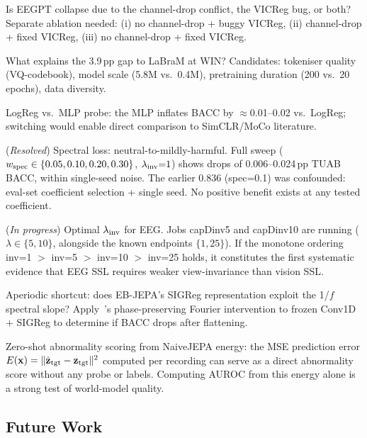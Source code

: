 \documentclass[11pt,a4paper]{article}
\begin{document}
\begin{description}[noitemsep]
  \item[D1] Is EEGPT collapse due to the channel-drop conflict, the VICReg bug, or both?
    Separate ablation needed: (i) no channel-drop + buggy VICReg, (ii) channel-drop +
    fixed VICReg, (iii) no channel-drop + fixed VICReg.
  \item[D2] What explains the 3.9\,pp gap to LaBraM at WIN?
    Candidates: tokeniser quality (VQ-codebook), model scale (5.8M vs.\ 0.4M),
    pretraining duration (200 vs.\ 20 epochs), data diversity.
  \item[D3] LogReg vs.\ MLP probe: the MLP inflates BACC by $\approx$0.01--0.02
    vs.\ LogReg; switching would enable direct comparison to SimCLR/MoCo literature.
  \item[D4] (\emph{Resolved}) Spectral loss: neutral-to-mildly-harmful.
    Full sweep ($w_{\rm spec} \in \{0.05, 0.10, 0.20, 0.30\}$, $\lambda_{\rm inv}{=}1$)
    shows drops of 0.006--0.024\,pp TUAB BACC, within single-seed noise.
    The earlier 0.836 (spec=0.1) was confounded: eval-set coefficient selection + single seed.
    No positive benefit exists at any tested coefficient.
  \item[D7] (\emph{In progress}) Optimal $\lambda_{\rm inv}$ for EEG.
    Jobs capDinv5 and capDinv10 are running ($\lambda \in \{5, 10\}$, alongside the
    known endpoints $\{1, 25\}$).  If the monotone ordering inv=1 $>$ inv=5 $>$ inv=10 $>$
    inv=25 holds, it constitutes the first systematic evidence that EEG SSL requires
    weaker view-invariance than vision SSL.
  \item[D5] Aperiodic shortcut: does EB-JEPA's SIGReg representation exploit the 1/$f$
    spectral slope?  Apply~\cite{spectral_audit}'s phase-preserving Fourier intervention to
    frozen Conv1D + SIGReg to determine if BACC drops after flattening.
  \item[D6] Zero-shot abnormality scoring from NaiveJEPA energy: the MSE prediction error
    $E(\mathbf{x}) = \|\hat{\mathbf{z}}_{\rm tgt} - \mathbf{z}_{\rm tgt}\|^2$ computed per
    recording can serve as a direct abnormality score without any probe or labels.
    Computing AUROC from this energy alone is a strong test of world-model quality.
\end{description}

\subsection{Future Work}
\end{document}

